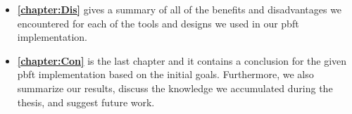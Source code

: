 \begin{itemize}
\item \textbf{\autoref{chapter:Dis}} gives a summary of all of the benefits and disadvantages we encountered for each of the tools and designs we used in our \ac{pbft} implementation.

\item \textbf{\autoref{chapter:Con}} is the last chapter and it contains a conclusion for the given \ac{pbft} implementation based on the initial goals. Furthermore, we also summarize our results, discuss the knowledge we accumulated during the thesis, and suggest future work.
\end{itemize}